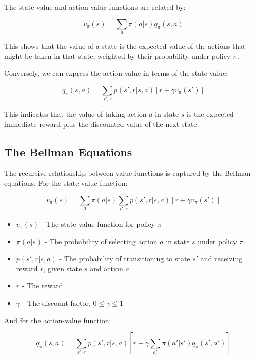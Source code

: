 \documentclass[12pt,a4paper]{article}
\begin{document}
The state-value and action-value functions are related by:

\begin{equation}
v_{\pi}(s) = \sum_{a} \pi(a|s) q_{\pi}(s, a)
\end{equation}

This shows that the value of a state is the expected value of the actions that might be taken in that state, weighted by their probability under policy $\pi$.

Conversely, we can express the action-value in terms of the state-value:

\begin{equation}
q_{\pi}(s, a) = \sum_{s', r} p(s', r|s, a) [r + \gamma v_{\pi}(s')]
\end{equation}

This indicates that the value of taking action $a$ in state $s$ is the expected immediate reward plus the discounted value of the next state.

\subsection{The Bellman Equations}

The recursive relationship between value functions is captured by the Bellman equations. For the state-value function:

\begin{equation}
v_{\pi}(s) = \sum_{a} \pi(a|s) \sum_{s',r} p(s',r|s,a) [r + \gamma v_{\pi}(s')]
\end{equation}

\begin{tcolorbox}[title=Notation Overview]
\begin{itemize}
    \item $v_{\pi}(s)$ - The state-value function for policy $\pi$
    \item $\pi(a|s)$ - The probability of selecting action $a$ in state $s$ under policy $\pi$
    \item $p(s',r|s,a)$ - The probability of transitioning to state $s'$ and receiving reward $r$, given state $s$ and action $a$
    \item $r$ - The reward
    \item $\gamma$ - The discount factor, $0 \leq \gamma \leq 1$
\end{itemize}
\end{tcolorbox}

And for the action-value function:

\begin{equation}
q_{\pi}(s,a) = \sum_{s',r} p(s',r|s,a) \left[r + \gamma \sum_{a'} \pi(a'|s') q_{\pi}(s',a') \right]
\end{equation}
\end{document}
